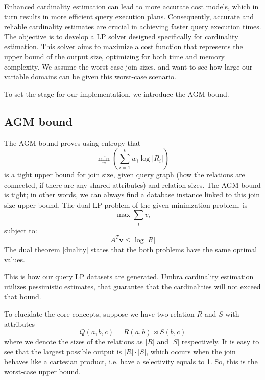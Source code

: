 Enhanced cardinality estimation
can lead to more accurate cost models, which in turn results
in more efficient query execution plans.
Consequently, accurate and reliable cardinality estimates are
crucial in achieving faster query execution times.
The objective is to develop a LP
solver designed specifically for cardinality estimation.
This solver aims to maximize a cost function that represents
the upper bound of the output size, optimizing for both
time and memory complexity.
We assume the worst-case join sizes, and want to see how large our variable domains
can be given this worst-case scenario.

To set the stage for our implementation, we introduce the AGM bound.

\subsection{AGM bound}
The AGM bound \parencite{atserias2013size} proves
using entropy that \[ \min_w \left( \sum_{i=1}^{k} w_i \log |R_i| \right) \]
is a tight upper bound for join size, given query graph (how the
relations are connected, if there are any shared attributes)
and relation sizes. The AGM bound is tight; in other words, we can always find
a database instance linked to this join size upper bound.
The dual LP problem of the given minimzation problem, is
\[ \max \sum_{i} v_i \]
subject to:
\[ A^T \mathbf{v} \leq \log |R| \]
The dual theorem \ref{duality} states that the both problems have the same
optimal values.

This is how our query LP datasets are generated.
Umbra cardinality estimation utilizes pessimistic estimates, that guarantee that the cardinalities will not exceed that bound.

To elucidate the core concepts,
suppose we have two relation $R$ and $S$ with attributes
\[
    Q(a, b, c) = R(a, b) \Join S(b, c)
\]
where we denote the sizes of the relations as
$|R|$ and $|S|$ respectively.
It is easy to see that the largest possible output is $|R| \cdot |S|$, which occurs when the join
behaves like a cartesian product, i.e. have a selectivity equals to 1. So, this is the worst-case
upper bound.

